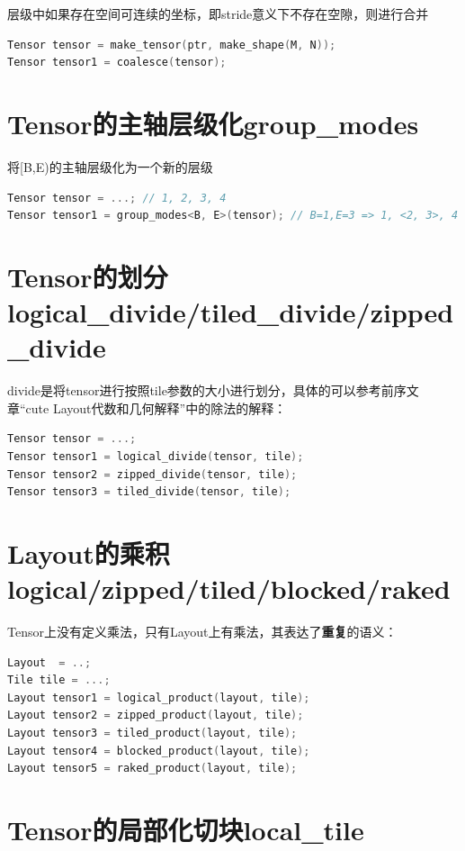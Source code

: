 层级中如果存在空间可连续的坐标，即stride意义下不存在空隙，则进行合并

\begin{lstlisting}[language=C++]
Tensor tensor = make_tensor(ptr, make_shape(M, N));
Tensor tensor1 = coalesce(tensor);
\end{lstlisting}

\section{Tensor的主轴层级化group\_modes}

将[B,E)的主轴层级化为一个新的层级

\begin{lstlisting}[language=C++]
Tensor tensor = ...; // 1, 2, 3, 4
Tensor tensor1 = group_modes<B, E>(tensor); // B=1,E=3 => 1, <2, 3>, 4
\end{lstlisting}

\section{Tensor的划分logical\_divide/tiled\_divide/zipped\_divide}

divide是将tensor进行按照tile参数的大小进行划分，具体的可以参考前序文章“cute Layout代数和几何解释”中的除法的解释：

\begin{lstlisting}[language=C++]
Tensor tensor = ...;
Tensor tensor1 = logical_divide(tensor, tile);
Tensor tensor2 = zipped_divide(tensor, tile);
Tensor tensor3 = tiled_divide(tensor, tile);
\end{lstlisting}

\section{Layout的乘积logical/zipped/tiled/blocked/raked}

Tensor上没有定义乘法，只有Layout上有乘法，其表达了\textbf{重复}的语义：

\begin{lstlisting}[language=C++]
Layout  = ..;
Tile tile = ...;
Layout tensor1 = logical_product(layout, tile);
Layout tensor2 = zipped_product(layout, tile);
Layout tensor3 = tiled_product(layout, tile);
Layout tensor4 = blocked_product(layout, tile);
Layout tensor5 = raked_product(layout, tile);
\end{lstlisting}

\section{Tensor的局部化切块local\_tile}


